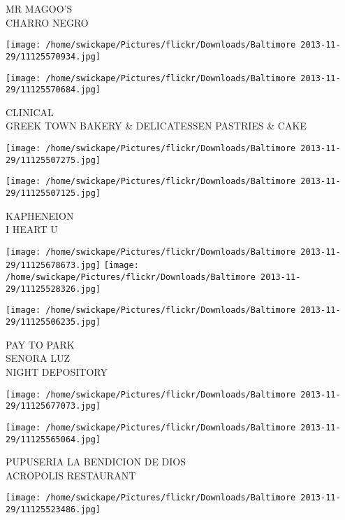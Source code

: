 \documentclass[10pt,letterpaper]{article}
\begin{document}
MR MAGOO'S\\
CHARRO NEGRO\\
\pagebreak

\texttt{[image: /home/swickape/Pictures/flickr/Downloads/Baltimore 2013-11-29/11125570934.jpg]}

\vspace{0.25in}
\texttt{[image: /home/swickape/Pictures/flickr/Downloads/Baltimore 2013-11-29/11125570684.jpg]}

CLINICAL\\
GREEK TOWN BAKERY \& DELICATESSEN PASTRIES \& CAKE\\
\pagebreak

\texttt{[image: /home/swickape/Pictures/flickr/Downloads/Baltimore 2013-11-29/11125507275.jpg]}

\vspace{0.25in}
\texttt{[image: /home/swickape/Pictures/flickr/Downloads/Baltimore 2013-11-29/11125507125.jpg]}

KAPHENEION\\
I HEART U\\
\pagebreak

\texttt{[image: /home/swickape/Pictures/flickr/Downloads/Baltimore 2013-11-29/11125678673.jpg]}
\texttt{[image: /home/swickape/Pictures/flickr/Downloads/Baltimore 2013-11-29/11125528326.jpg]}

\vspace{0.25in}
\texttt{[image: /home/swickape/Pictures/flickr/Downloads/Baltimore 2013-11-29/11125506235.jpg]}

PAY TO PARK\\
SENORA LUZ\\
NIGHT DEPOSITORY\\
\pagebreak

\texttt{[image: /home/swickape/Pictures/flickr/Downloads/Baltimore 2013-11-29/11125677073.jpg]}

\vspace{0.25in}
\texttt{[image: /home/swickape/Pictures/flickr/Downloads/Baltimore 2013-11-29/11125565064.jpg]}

PUPUSERIA LA BENDICION DE DIOS\\
ACROPOLIS RESTAURANT\\
\pagebreak

\texttt{[image: /home/swickape/Pictures/flickr/Downloads/Baltimore 2013-11-29/11125523486.jpg]}
\end{document}
